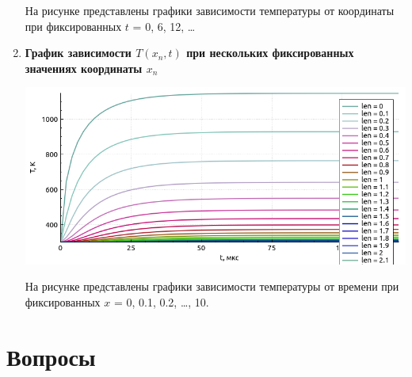 \documentclass[a4paper,oneside,12pt]{extreport}
\begin{document}
\begin{enumerate}
	На рисунке представлены графики зависимости температуры от координаты при фиксированных $t$ = 0, 6, 12, …


	\item \textbf{График зависимости $T(x_n, t)$ при нескольких фиксированных значениях координаты $x_n$}

	\includegraphics[width=\linewidth]{inc/img/graph1-2}

	На рисунке представлены графики зависимости температуры от времени при фиксированных $x$ = 0, 0.1, 0.2, …, 10.
\end{enumerate}

\section*{Вопросы}
\end{document}
